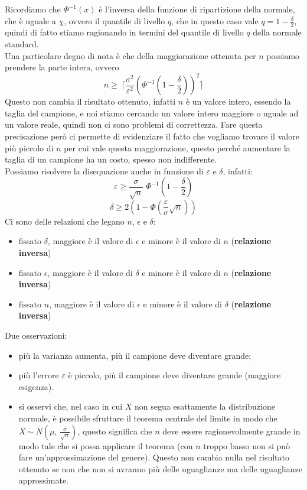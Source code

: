 Ricordiamo che $\Phi^{-1} \left (x \right )$ è l'inversa della funzione di ripartizione della normale, che è uguale a $\chi$, ovvero il quantile di livello $q$, che in questo caso vale $q = 1 - \frac{\delta}{2}$, quindi di fatto stiamo ragionando in termini del quantile di livello $q$ della normale standard. \\
Una particolare degno di nota è che della maggiorazione ottenuta per $n$ possiamo prendere la parte intera, ovvero $$n \geq \ \Biggl \lceil \frac{\sigma^2}{\varepsilon^2} \left ( \Phi^{-1} \left (1 - \frac{\delta}{2} \right ) \! \right )^{\! 2}\Biggl \rceil$$
Questo non cambia il risultato ottenuto, infatti $n$ è un valore intero, essendo la taglia del campione, e noi stiamo cercando un valore intero maggiore o uguale ad un valore reale, quindi non ci sono problemi di correttezza. Fare questa precisazione però ci permette di evidenziare il fatto che vogliamo trovare il valore più piccolo di $n$ per cui vale questa maggiorazione, questo perché aumentare la taglia di un campione ha un costo, spesso non indifferente. \\
Possiamo risolvere la disequazione anche in funzione di $\varepsilon$ e $\delta$, infatti:
$$\varepsilon \geq \frac{\sigma}{\sqrt{n}} \; \Phi^{-1} \left (1 - \frac{\delta}{2} \right )$$
$$\delta \geq 2  \left (1 - \Phi \left (\frac{\varepsilon}{\sigma}\sqrt{n} \right ) \right )$$
Ci sono delle relazioni che legano $n$, $\epsilon$ e $\delta$:
\begin{itemize}
    \item fissato $\delta$, maggiore è il valore di $\epsilon$ e minore è il valore di $n$ (\textbf{relazione inversa}) 
    \item fissato $\epsilon$, maggiore è il valore di $\delta$ e minore è il valore di $n$ (\textbf{relazione inversa})
    \item fissato $n$, maggiore è il valore di $\epsilon$ e minore è il valore di $\delta$ (\textbf{relazione inversa}) 
\end{itemize}


\noindent Due osservazioni:
\begin{itemize}
    \item più la varianza aumenta, più il campione deve diventare grande;
    \item più l'errore $\varepsilon$ è piccolo, più il campione deve diventare grande (maggiore esigenza).
    \item si osservi che, nel caso in cui $X$ non segua esattamente la distribuzione normale, è possibile sfruttare il teorema centrale del limite in modo che $\overline X \ \dot \sim \ N \! \left(\mu, \, \frac{\sigma}{\sqrt n}\right)$, questo significa che $n$ deve essere ragionevolmente grande in modo tale che si possa applicare il teorema (con $n$ troppo basso non si può fare un'approssimazione del genere). Questo non cambia nulla nel risultato ottenuto se non che non si avranno più delle uguaglianze ma delle uguaglianze approssimate.
\end{itemize}

